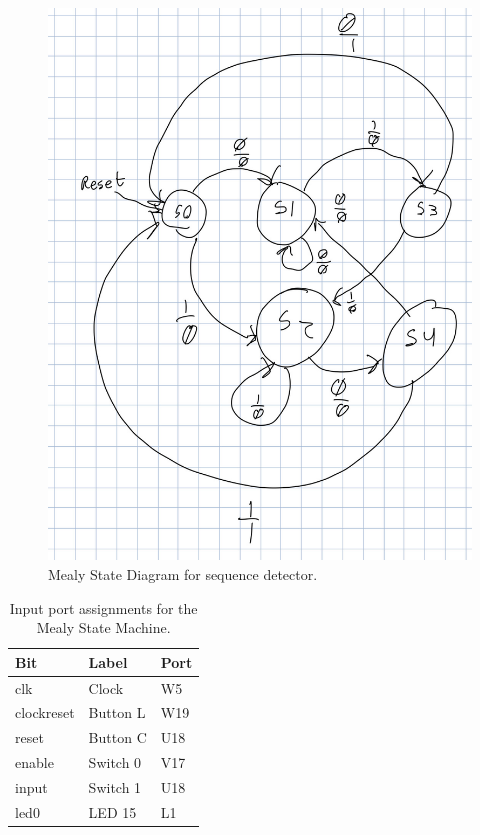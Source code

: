 \documentclass[11pt]{article}
\begin{document}
\begin{center}
\begin{figure}
	\includegraphics[width=\textwidth]{images/img2.jpg}
	\caption{\label{fig:mealy_machine}Mealy State Diagram for sequence detector.}
\end{figure}
\end{center}

\begin{table}[H]
\begin{center}
\begin{tabular}{| l | l | l |}
	\hline
	Bit & Label & Port \\ \hline
	clk & Clock & W5 \\ \hline
	clockreset & Button L & W19 \\ \hline
	reset & Button C & U18 \\ \hline
	enable & Switch 0 & V17 \\ \hline
	input & Switch 1 & U18 \\ \hline
	led0 & LED 15 & L1 \\ \hline
\end{tabular}
\caption{\label{tab:mealy_input_ports}Input port assignments for the Mealy State Machine.}
\end{center}
\end{table}
\end{document}
